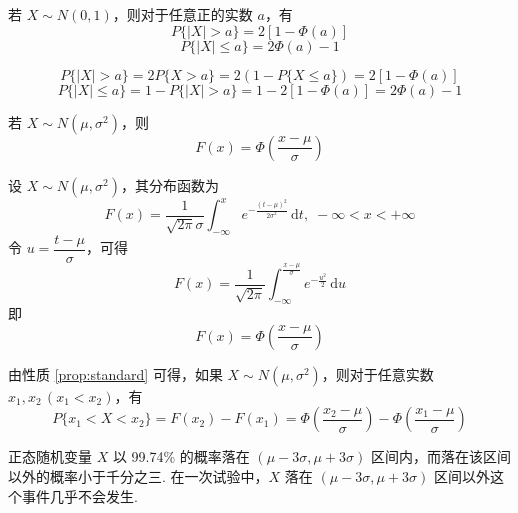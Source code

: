 \begin{property}
    若 $X \sim N(0,1)$，则对于任意正的实数 $a$，有
    \begin{equation} \label{equation:P(X>a)}
        P\{|X|>a\}=2[1-\varPhi(a)]
    \end{equation}
    \begin{equation} \label{equation:P(X<=a)}
        P\{|X| \leqslant a\} = 2\varPhi(a)-1
    \end{equation}
\end{property}

\begin{myproof}
    $$
    P\{|X|>a\} = 2 P\{X>a\} = 2(1-P\{X \leqslant a\}) = 2[1-\varPhi(a)]
    $$
    $$
    P\{|X| \leqslant a\} = 1-P\{|X|>a\} = 1-2[1-\varPhi(a)] = 2\varPhi(a)-1
    $$
\end{myproof}

\begin{property}[（正态分布的标准化）] \label{prop:standard}
    若 $X \sim N(\mu,\sigma^2)$，则
    \begin{equation} \label{equation:standard}
        F(x)=\varPhi(\dfrac{x-\mu}{\sigma})
    \end{equation}
\end{property}

\begin{myproof}
    设 $X \sim N(\mu,\sigma^2)$，其分布函数为
    $$
    F(x) = \dfrac{1}{\sqrt{2\pi}\sigma} \int_{-\infty}^x e^{-\frac{(t-\mu)^2}{2\sigma^2}}\,\text{d}t, \; -\infty < x < +\infty
    $$
    令 $u=\dfrac{t-\mu}{\sigma}$，可得
    $$
    F(x)=\dfrac{1}{\sqrt{2\pi}} \int_{-\infty}^{\frac{x-\mu}{\sigma}} e^{-\frac{u^2}{2}}\,\text{d}u
    $$
    即
    $$
        F(x)=\varPhi(\dfrac{x-\mu}{\sigma})
    $$
\end{myproof}

由性质 \ref*{prop:standard} 可得，如果 $X \sim N(\mu,\sigma^2)$，则对于任意实数 $x_1,x_2\,(x_1 < x_2)$，有
\begin{equation}
    P\{x_1 < X < x_2\} = F(x_2)-F(x_1) = \varPhi(\dfrac{x_2-\mu}{\sigma}) - \varPhi(\dfrac{x_1-\mu}{\sigma})
\end{equation}

\begin{conclusion}[（$3\sigma$ 规则）]
    正态随机变量 $X$ 以 99.74\% 的概率落在 $(\mu - 3\sigma, \mu + 3\sigma)$ 区间内，而落在该区间以外的概率小于千分之三. 在一次试验中，$X$ 落在 $(\mu - 3\sigma, \mu + 3\sigma)$ 区间以外这个事件几乎不会发生.
\end{conclusion}

